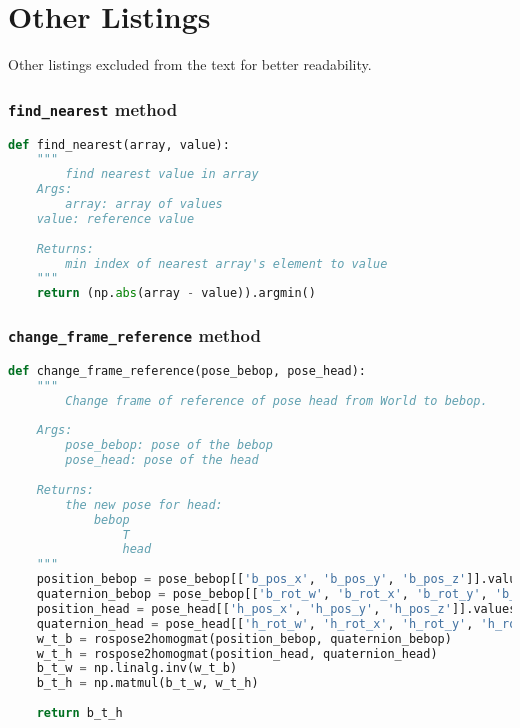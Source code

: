 \chapter{Other Listings}
\label{Appen:B}
Other listings excluded from the text for better readability.
\subsection*{\texttt{find\_nearest} method}
\begin{lstlisting}[caption={Find Nearest function},label={lst:nearest},language=Python]
def find_nearest(array, value):
	"""
		find nearest value in array
	Args:
		array: array of values
	value: reference value
	
	Returns:
		min index of nearest array's element to value
	"""
	return (np.abs(array - value)).argmin()
\end{lstlisting}
\subsection*{\texttt{change\_frame\_reference} method}
\begin{lstlisting}[caption={Change frame of reference},label={lst:changeframe},language=Python]
def change_frame_reference(pose_bebop, pose_head):
	"""
		Change frame of reference of pose head from World to bebop.
	
	Args:
		pose_bebop: pose of the bebop
		pose_head: pose of the head
	
	Returns:
		the new pose for head:
			bebop
				T
				head
	"""
	position_bebop = pose_bebop[['b_pos_x', 'b_pos_y', 'b_pos_z']].values
	quaternion_bebop = pose_bebop[['b_rot_w', 'b_rot_x', 'b_rot_y', 'b_rot_z']].values
	position_head = pose_head[['h_pos_x', 'h_pos_y', 'h_pos_z']].values
	quaternion_head = pose_head[['h_rot_w', 'h_rot_x', 'h_rot_y', 'h_rot_z']].values
	w_t_b = rospose2homogmat(position_bebop, quaternion_bebop)
	w_t_h = rospose2homogmat(position_head, quaternion_head)
	b_t_w = np.linalg.inv(w_t_b)
	b_t_h = np.matmul(b_t_w, w_t_h)
	
	return b_t_h
\end{lstlisting}
